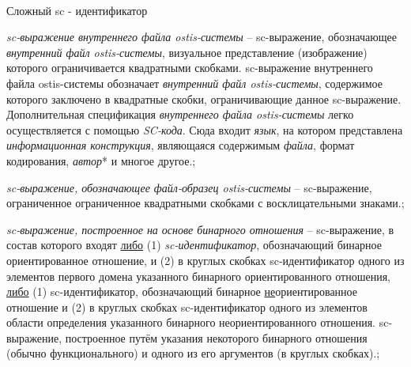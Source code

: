 \begin{frame}{\\Сложный sc - идентификатор}
	\topline
	\justifying
	\vspace*{\fill}\\
	\scriptsize{
		\begin{textitemize}
			\item{\textit{sc-выражение внутреннего файла ostis-системы} -- sc-выражение, обозначающее \textit{внутренний файл ostis-системы}, визуальное представление (изображение) которого ограничивается квадратными скобками. sc-выражение внутреннего файла ostis-системы обозначает \textit{внутренний файл ostis-системы}, содержимое которого заключено в квадратные скобки, ограничивающие данное sc-выражение.
				Дополнительная спецификация \textit{внутреннего файла ostis-системы} легко осуществляется с помощью \textit{SC-кода}. Сюда входит \textit{язык}, на котором представлена \textit{информационная конструкция}, являющаяся содержимым \textit{файла}, формат кодирования, \textit{автор}* и многое другое.};
			\item{\textit{sc-выражение, обозначающее файл-образец ostis-системы} -- sc-выражение, ограниченное ограниченное квадратными скобками с восклицательными знаками.};
			\item{\textit{sc-выражение, построенное на основе бинарного отношения} -- sc-выражение, в состав которого входят \uline{либо} (1) \textit{sc-идентификатор}, обозначающий бинарное ориентированное отношение, и (2) в круглых скобках sc-идентификатор одного из элементов первого домена указанного бинарного ориентированного отношения, \uline{либо} (1) sc-идентификатор, обозначающий бинарное \uline{не}ориентированное отношение и (2) в круглых скобках sc-идентификатор одного из элементов области определения указанного бинарного неориентированного отношения. sc-выражение, построенное путём указания некоторого бинарного отношения (обычно функционального) и одного из его аргументов (в круглых скобках).};
		\end{textitemize}	
	}
\end{frame}
